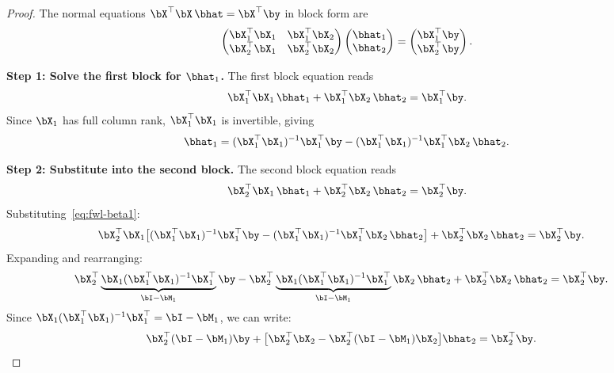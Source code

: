 
\begin{proof}
The normal equations $\bX^\top\bX\,\bhat = \bX^\top\by$ in block form are
\begin{equation}\label{eq:fwl-blocks}
  \begin{pmatrix}
    \bX_1^\top\bX_1 & \bX_1^\top\bX_2 \\
    \bX_2^\top\bX_1 & \bX_2^\top\bX_2
  \end{pmatrix}
  \begin{pmatrix}\bhat_1 \\ \bhat_2\end{pmatrix}
  =
  \begin{pmatrix}\bX_1^\top\by \\ \bX_2^\top\by\end{pmatrix}.
\end{equation}

\noindent\textbf{Step 1: Solve the first block for $\bhat_1$.}
The first block equation reads
\[
  \bX_1^\top\bX_1\,\bhat_1 + \bX_1^\top\bX_2\,\bhat_2
  = \bX_1^\top\by.
\]
Since $\bX_1$ has full column rank, $\bX_1^\top\bX_1$ is invertible, giving
\begin{equation}\label{eq:fwl-beta1}
  \bhat_1
  = (\bX_1^\top\bX_1)^{-1}\bX_1^\top\by
    - (\bX_1^\top\bX_1)^{-1}\bX_1^\top\bX_2\,\bhat_2.
\end{equation}

\noindent\textbf{Step 2: Substitute into the second block.}
The second block equation reads
\[
  \bX_2^\top\bX_1\,\bhat_1 + \bX_2^\top\bX_2\,\bhat_2
  = \bX_2^\top\by.
\]
Substituting~\eqref{eq:fwl-beta1}:
\begin{align*}
  \bX_2^\top\bX_1
  \bigl[(\bX_1^\top\bX_1)^{-1}\bX_1^\top\by
        &- (\bX_1^\top\bX_1)^{-1}\bX_1^\top\bX_2\,\bhat_2\bigr]
  + \bX_2^\top\bX_2\,\bhat_2
  = \bX_2^\top\by.
\end{align*}
Expanding and rearranging:
\begin{align*}
  &\bX_2^\top\underbrace{\bX_1(\bX_1^\top\bX_1)^{-1}\bX_1^\top}_{\bI - \bM_1}\by
  - \bX_2^\top\underbrace{\bX_1(\bX_1^\top\bX_1)^{-1}\bX_1^\top}_{\bI - \bM_1}\bX_2\,\bhat_2
  + \bX_2^\top\bX_2\,\bhat_2
  = \bX_2^\top\by.
\end{align*}
Since $\bX_1(\bX_1^\top\bX_1)^{-1}\bX_1^\top = \bI - \bM_1$, we can write:
\begin{align*}
  \bX_2^\top(\bI - \bM_1)\by
  &+ \bigl[\bX_2^\top\bX_2
     - \bX_2^\top(\bI - \bM_1)\bX_2\bigr]\bhat_2
  = \bX_2^\top\by.
\end{align*}


\end{proof}
